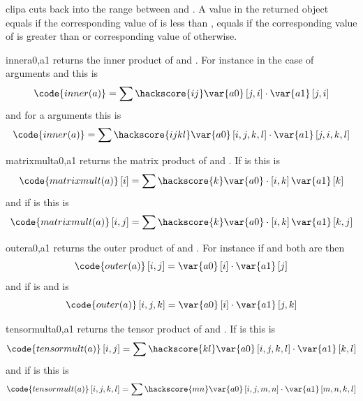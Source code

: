 \begin{funcdesc}{clip}{a}
cuts back  into the range between  and . A value in the returned object equals 
 if the corresponding value of  is less than , equals  if the 
 corresponding value of  is greater than 
or corresponding value of  otherwise.
\end{funcdesc}
\begin{funcdesc}{inner}{a0,a1}
returns the inner product of  and . For instance in the
case of \RankTwo arguments and this is 
\begin{equation}
\code{inner(a)}=\sum\hackscore{ij}\var{a0} \left[j,i\right]  \cdot \var{a1} \left[j,i\right]
\end{equation} 
and for a \RankFour arguments this is
\begin{equation}
\code{inner(a)}=\sum\hackscore{ijkl}\var{a0} \left[i,j,k,l\right]  \cdot \var{a1} \left[j,i,k,l\right]
\end{equation} 
\end{funcdesc}
\begin{funcdesc}{matrixmult}{a0,a1}
returns the matrix product of  and . If  is \RankOne this is
\begin{equation}
\code{matrixmult(a)}\left[i\right]=\sum\hackscore{k}\var{a0}  \cdot \left[i,k\right]\var{a1} \left[k\right]
\end{equation} 
and if  is \RankTwo this is
\begin{equation}
\code{matrixmult(a)}\left[i,j\right]=\sum\hackscore{k}\var{a0}  \cdot \left[i,k\right]\var{a1} \left[k,j\right]
\end{equation} 
\end{funcdesc}
\begin{funcdesc}{outer}{a0,a1}
returns the outer product of  and . For instance if  and  both are \RankOne then
\begin{equation}
\code{outer(a)}\left[i,j\right]=\var{a0} \left[i\right]  \cdot  \var{a1}\left[j\right]
\end{equation} 
and if  is \RankOne and  is \RankThree
\begin{equation}
\code{outer(a)}\left[i,j,k\right]=\var{a0} \left[i\right] \cdot \var{a1}\left[j,k\right]
\end{equation} 
\end{funcdesc}
\begin{funcdesc}{tensormult}{a0,a1}
returns the tensor product of  and . If  is \RankTwo this is
\begin{equation}
\code{tensormult(a)}\left[i,j\right]=\sum\hackscore{kl}\var{a0}\left[i,j,k,l\right] \cdot \var{a1} \left[k,l\right]
\end{equation} 
and if  is \RankFour this is
\begin{equation}
\code{tensormult(a)}\left[i,j,k,l\right]=\sum\hackscore{mn}\var{a0} \left[i,j,m,n\right] \cdot \var{a1} \left[m,n,k,l\right]
\end{equation} 
\end{funcdesc}
